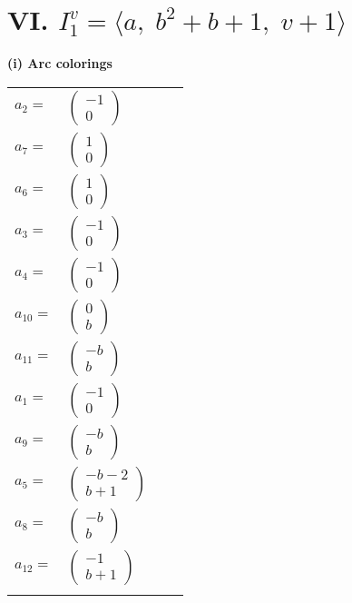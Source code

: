 \documentclass[1p]{elsarticle_modified}
\theoremstyle{definition}
\begin{document}
\centering \section*{VI. $I^v_{1}= \langle a,\;b^2+b+1,\;v+1 \rangle$}
\flushleft \textbf{(i) Arc colorings}\\
\begin{tabular}{m{7pt} m{180pt} m{7pt} m{180pt} }
\flushright $a_{2}=$&$\begin{pmatrix}-1\\0\end{pmatrix}$ \\
\flushright $a_{7}=$&$\begin{pmatrix}1\\0\end{pmatrix}$ \\
\flushright $a_{6}=$&$\begin{pmatrix}1\\0\end{pmatrix}$ \\
\flushright $a_{3}=$&$\begin{pmatrix}-1\\0\end{pmatrix}$ \\
\flushright $a_{4}=$&$\begin{pmatrix}-1\\0\end{pmatrix}$ \\
\flushright $a_{10}=$&$\begin{pmatrix}0\\b\end{pmatrix}$ \\
\flushright $a_{11}=$&$\begin{pmatrix}- b\\b\end{pmatrix}$ \\
\flushright $a_{1}=$&$\begin{pmatrix}-1\\0\end{pmatrix}$ \\
\flushright $a_{9}=$&$\begin{pmatrix}- b\\b\end{pmatrix}$ \\
\flushright $a_{5}=$&$\begin{pmatrix}- b-2\\b+1\end{pmatrix}$ \\
\flushright $a_{8}=$&$\begin{pmatrix}- b\\b\end{pmatrix}$ \\
\flushright $a_{12}=$&$\begin{pmatrix}-1\\b+1\end{pmatrix}$\\&\end{tabular}
\end{document}
